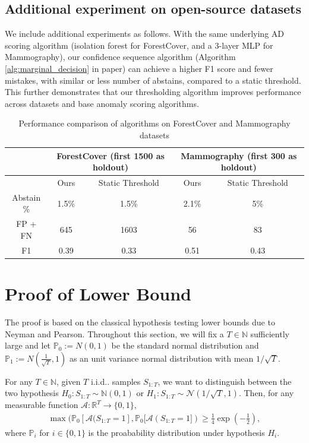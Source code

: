 \subsection{Additional experiment on open-source datasets}

We include additional experiments as follows. With the same underlying AD scoring algorithm (isolation forest for ForestCover, and a 3-layer MLP for Mammography), our confidence sequence algorithm (Algorithm \ref{alg:marginal_decision} in paper) can achieve a higher F1 score and fewer mistakes, with similar or less number of abstains, compared to a static threshold. This further demonstrates that our thresholding algorithm improves performance across datasets and base anomaly scoring algorithms.


\begin{table}[h!]
    \centering
    \begin{tabular}{ccc|cc}
        \toprule
       &\multicolumn{2}{c}{ForestCover (first 1500 as holdout)} & \multicolumn{2}{c}{Mammography (first 300 as holdout)} \\
        \midrule
        & Ours & Static Threshold & Ours & Static Threshold \\
        \midrule
        Abstain \% & 1.5\% & 1.5\% & 2.1\% & 5\% \\
        FP + FN & 645 & 1603 & 56 & 83 \\
        F1 & 0.39 & 0.33 & 0.51 & 0.43 \\
        \bottomrule
    \end{tabular}
    \caption{Performance comparison of algorithms on ForestCover and Mammography datasets}
    \label{tab:performance}
\end{table}



\section{Proof of Lower Bound}
\label{sec:lower_bound_proof}
The proof is based on the classical hypothesis testing lower bounds due to Neyman and Pearson. Throughout this section, we will fix a $T \in \mathbb{N}$ sufficiently large and let $\mathbb{P}_0 := N(0,1)$  be the standard normal distribution and $\mathbb{P}_{1} := N(\frac{1}{\sqrt{T}},1)$ as an unit variance normal distribution with mean $1/\sqrt{T}$. 

\begin{theorem}
For any $T \in \mathbb{N}$, given $T$ i.i.d.. samples $S_{1:T}$, we want to distinguish between the two hypothesis $H_0: S_{1:T} \sim \mathbb{N}(0,1)$ or $H_1: S_{1:T} \sim \mathcal{N}(1/\sqrt{T},1)$. Then, for any measurable function $\mathcal{A} : \mathbb{R}^T \to \{0,1\}$, 
\begin{align*}
   \max( \mathbb{P}_0[\mathcal{A}(S_{1:T}=1], \mathbb{P}_0[\mathcal{A}(S_{1:T}=1]) \geq \frac{1}{4} \exp(-\frac{1}{2}),
\end{align*}
    where $\mathbb{P}_{i}$ for $i \in \{0,1\}$ is the proabability distribution under hypothesis $H_i$.
    \label{thm:neyman_pearson}
\end{theorem}


